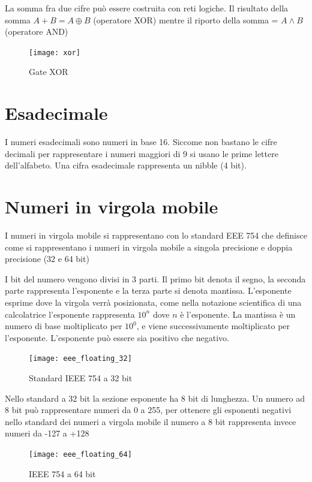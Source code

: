 La somma fra due cifre può essere costruita con reti logiche. Il risultato della somma $ A + B = A \oplus B $ (operatore XOR) mentre il riporto della somma = $ A \land B $ (operatore AND)

\begin{figure}
	\centering
	\caption{Gate XOR}
	\texttt{[image: xor]}
\end{figure}

\section{Esadecimale} 

I numeri esadecimali sono numeri in base 16. Siccome non bastano le cifre decimali per rappresentare i numeri maggiori di 9 si usano le prime lettere dell'alfabeto.
Una cifra esadecimale rappresenta un nibble (4 bit).

\section{Numeri in virgola mobile}

I numeri in virgola mobile si rappresentano con lo standard EEE 754 che definisce come si rappresentano i numeri in virgola mobile a singola precisione e doppia precisione (32 e 64 bit)

I bit del numero vengono divisi in 3 parti. Il primo bit denota il segno, la seconda parte rappresenta l'esponente e la terza parte si denota mantissa. L'esponente esprime dove la virgola verrà posizionata, come nella notazione scientifica di una calcolatrice l'esponente rappresenta $ 10^{n} $ dove $ n $ è l'esponente. La mantissa è un numero di base moltiplicato per $ 10^0 $, e viene successivamente moltiplicato per l'esponente.
L'esponente può essere sia positivo che negativo.

\begin{figure}
	\caption{Standard IEEE 754 a 32 bit}
	\texttt{[image: eee\_floating\_32]}
\end{figure}

Nello standard a 32 bit la sezione esponente ha 8 bit di lunghezza. Un numero ad 8 bit può rappresentare numeri da 0 a 255, per ottenere gli esponenti negativi nello standard dei numeri a virgola mobile il numero a 8 bit rappresenta invece numeri da -127 a +128

\begin{figure}
	\caption{IEEE 754 a 64 bit}
	\texttt{[image: eee\_floating\_64]}
\end{figure}

